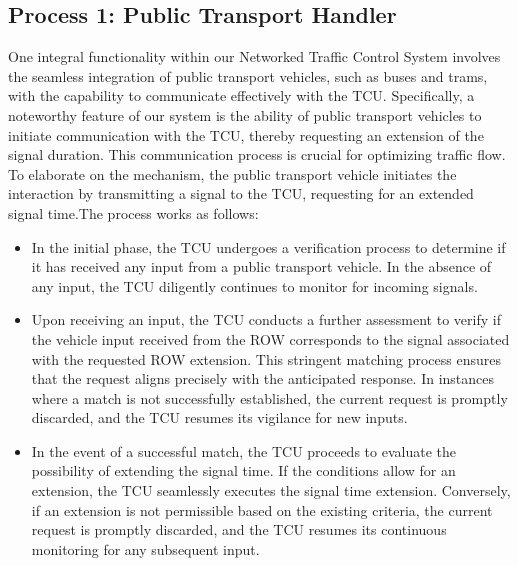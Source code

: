 \subsection{Process 1: Public Transport Handler}
\label{subsec:process_1}
One integral functionality within our Networked Traffic Control System involves the seamless integration of public transport vehicles, such as buses and trams, with the capability to communicate effectively with the TCU. Specifically, a noteworthy feature of our system is the ability of public transport vehicles to initiate communication with the TCU, thereby requesting an extension of the signal duration. This communication process is crucial for optimizing traffic flow. To elaborate on the mechanism, the public transport vehicle initiates the interaction by transmitting a signal to the TCU, requesting for an extended signal time.The process works as follows:
\begin{itemize}
\item In the initial phase, the TCU undergoes a verification process to determine if it has received any input from a public transport vehicle. In the absence of any input, the TCU diligently continues to monitor for incoming signals.
\item Upon receiving an input, the TCU conducts a further assessment to verify if the vehicle input received from the ROW corresponds to the signal associated with the requested ROW extension. This stringent matching process ensures that the request aligns precisely with the anticipated response. In instances where a match is not successfully established, the current request is promptly discarded, and the TCU resumes its vigilance for new inputs.
\item In the event of a successful match, the TCU proceeds to evaluate the possibility of extending the signal time. If the conditions allow for an extension, the TCU seamlessly executes the signal time extension. Conversely, if an extension is not permissible based on the existing criteria, the current request is promptly discarded, and the TCU resumes its continuous monitoring for any subsequent input.
\end{itemize}
